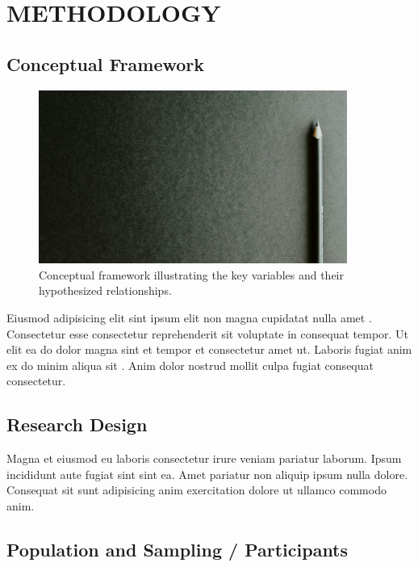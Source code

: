 \chapter{METHODOLOGY}

\section{Conceptual Framework}
\begin{figure}[ht]
  \centering
  \includegraphics[width=0.9\textwidth]{figures/placeholder-figure.jpg}
  \caption[Conceptual Framework of the Study]{Conceptual framework illustrating the key variables and their hypothesized relationships.}
  \label{fig:conceptual_framework}
\end{figure}

Eiusmod adipisicing elit sint ipsum elit non magna cupidatat nulla amet \parencite{placeholderArticle2023}. Consectetur esse consectetur reprehenderit sit voluptate in consequat tempor. Ut elit ea do dolor magna sint et tempor et consectetur amet ut. Laboris fugiat anim ex do minim aliqua sit \textcite{placeholderBook2023}. Anim dolor nostrud mollit culpa fugiat consequat consectetur.

\section{Research Design}
Magna et eiusmod eu laboris consectetur irure veniam pariatur laborum. Ipsum incididunt aute fugiat sint sint ea. Amet pariatur non aliquip ipsum nulla dolore. Consequat sit sunt adipisicing anim exercitation dolore ut ullamco commodo anim.

\section{Population and Sampling / Participants}

